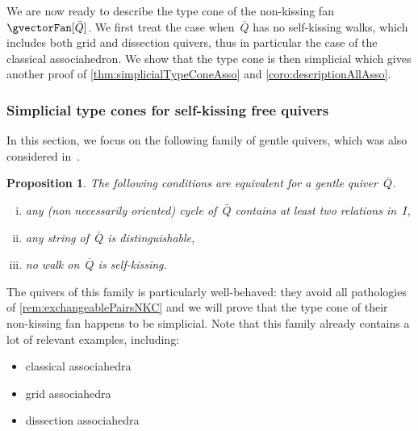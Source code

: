 \documentclass{amsart}
\newtheorem{proposition}[theorem]{Proposition}
\theoremstyle{definition}
\newcommand{\vincent}[1]{\todo[color=blue!30]{#1 \\ \hfill --- V.}}
\newcommand{\quiver}{\bar Q} %
\begin{document}
\bigskip
We are now ready to describe the type cone of the non-kissing fan~$\gvectorFan[\quiver]$.
We first treat the case when~$\quiver$ has no self-kissing walks, which includes both grid and dissection quivers, thus in particular the case of the classical associahedron.
We show that the type cone is then simplicial which gives another proof of \cref{thm:simplicialTypeConeAsso} and \cref{coro:descriptionAllAsso}.

\subsubsection{Simplicial type cones for self-kissing free quivers}

In this section, we focus on the following family of gentle quivers, which was also considered in~\cite[Sect.~4]{}.

\begin{proposition}
\label{prop:noSelfKissing}
The following conditions are equivalent for a gentle quiver~$\quiver$.
\begin{enumerate}[(i)]
\item any (non necessarily oriented) cycle of~$\quiver$ contains at least two relations in~$I$,
\item any string of~$\quiver$ is distinguishable,
\item no walk on~$\quiver$ is self-kissing.
\end{enumerate}
\end{proposition}

The quivers of this family is particularly well-behaved: they avoid all pathologies of \cref{rem:exchangeablePairsNKC} and we will prove that the type cone of their non-kissing fan happens to be simplicial.
Note that this family already contains a lot of relevant examples, including:
\begin{itemize}
\item classical associahedra
\item grid associahedra
\item dissection associahedra
\end{itemize}
\vincent{More explicit. TODO}
\end{document}
